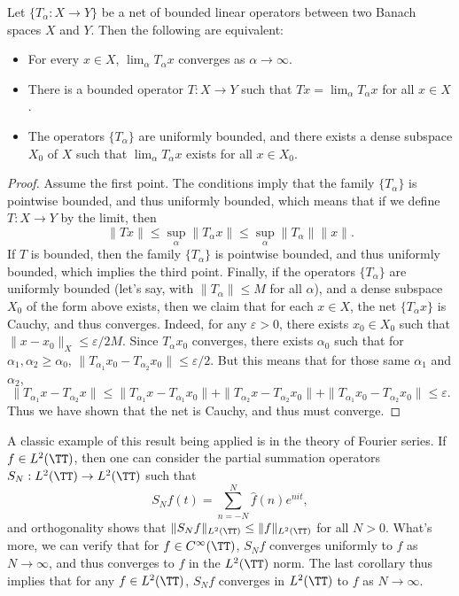 \begin{corollary}
    Let $\{ T_\alpha: X \to Y \}$ be a net of bounded linear operators between two Banach spaces $X$ and $Y$. Then the following are equivalent:
    \begin{itemize}
        \item For every $x \in X$, $\lim_\alpha T_\alpha x$ converges as $\alpha \to \infty$.
        \item There is a bounded operator $T: X \to Y$ such that $Tx = \lim_\alpha T_\alpha x$ for all $x \in X$.
        \item The operators $\{ T_\alpha \}$ are uniformly bounded, and there exists a dense subspace $X_0$ of $X$ such that $\lim_\alpha T_\alpha x$ exists for all $x \in X_0$.
    \end{itemize}
\end{corollary}
\begin{proof}
    Assume the first point. The conditions imply that the family $\{ T_\alpha \}$ is pointwise bounded, and thus uniformly bounded, which means that if we define $T: X \to Y$ by the limit, then
    \[ \| Tx \| \leq \sup_\alpha \| T_\alpha x \| \leq \sup_\alpha \| T_\alpha \| \| x \|. \]
    If $T$ is bounded, then the family $\{ T_\alpha \}$ is pointwise bounded, and thus uniformly bounded, which implies the third point. Finally, if the operators $\{ T_\alpha \}$ are uniformly bounded (let's say, with $\| T_\alpha \| \leq M$ for all $\alpha$), and a dense subspace $X_0$ of the form above exists, then we claim that for each $x \in X$, the net $\{ T_\alpha x \}$ is Cauchy, and thus converges. Indeed, for any $\varepsilon > 0$, there exists $x_0 \in X_0$ such that $\| x - x_0 \|_X \leq \varepsilon / 2M$. Since $T_\alpha x_0$ converges, there exists $\alpha_0$ such that for $\alpha_1,\alpha_2 \geq \alpha_0$, $\| T_{\alpha_1} x_0 - T_{\alpha_2} x_0 \| \leq \varepsilon / 2$. But this means that for those same $\alpha_1$ and $\alpha_2$,
    \[ \| T_{\alpha_1} x - T_{\alpha_2} x \| \leq \| T_{\alpha_1} x - T_{\alpha_1} x_0 \| + \| T_{\alpha_2} x - T_{\alpha_2} x_0 \| + \| T_{\alpha_1} x_0 - T_{\alpha_2} x_0 \| \leq \varepsilon. \]
    Thus we have shown that the net is Cauchy, and thus must converge.
\end{proof}

A classic example of this result being applied is in the theory of Fourier series. If $f \in L^2(\TT)$, then one can consider the partial summation operators $S_N: L^2(\TT) \to L^2(\TT)$ such that
%
\[ S_N f(t) = \sum_{n = -N}^N \widehat{f}(n) e^{nit}, \]
%
and orthogonality shows that $\| S_N f \|_{L^2(\TT)} \leq \| f \|_{L^2(\TT)}$ for all $N > 0$. What's more, we can verify that for $f \in C^\infty(\TT)$, $S_N f$ converges uniformly to $f$ as $N \to \infty$, and thus converges to $f$ in the $L^2(\TT)$ norm. The last corollary thus implies that for any $f \in L^2(\TT)$, $S_N f$ converges in $L^2(\TT)$ to $f$ as $N \to \infty$.

